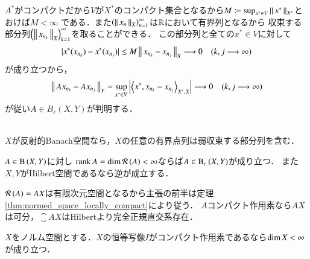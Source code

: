 \begin{prf}
\begin{description}
\begin{description}
						$A^*$がコンパクトだから$V$が$X^*$のコンパクト集合となるから$M \coloneqq \operatorname*{sup}_{x^* \in V} \left\|\, x^*\, \right\|_{X^*}$とおけば$M < \infty$
						である．また$\left(\left\|\, x_n\, \right\|_{X}\right)_{n=1}^{\infty}$は$\mathbb{R}$において有界列となるから
						収束する部分列$\left(\left\|\, x_{n_k}\, \right\|_{X}\right)_{k=1}^{\infty}$を取ることができる．
						この部分列と全ての$x^* \in V$に対して
						\begin{align}
							|x^*(x_{n_k}) - x^*(x_{n_j})| \leq M\left\|\, x_{n_k} - x_{n_j}\, \right\|_{X} \longrightarrow 0 \quad (k,j \longrightarrow \infty)
						\end{align}
						が成り立つから，
						\begin{align}
							\Norm{Ax_{n_k} - Ax_{n_j}}{Y} = \sup{x^* \in V}{\left|\inprod<x^*,x_{n_k} - x_{n_j}>_{X^*,X}\right|} \longrightarrow 0 \quad (k,j \longrightarrow \infty)
						\end{align}
						が従い$A \in B_c(X,Y)$が判明する．
						\QED
				\end{description}
		\end{description}
	\end{prf}
	
	\begin{screen}
		\begin{thm}[反射的Banach空間の弱点列コンパクト性]\mbox{}\\
			$X$が反射的Banach空間なら，$X$の任意の有界点列は弱収束する部分列を含む．
			\label{thm:weak_seq_compact}
		\end{thm}
	\end{screen}
	
	\begin{screen}
		\begin{thm}[有限次元空間における有界点列の収束]
			$A \in \mathrm{B}\left(X,Y\right) $に対し
			$\operatorname{rank} A = \operatorname{dim} \mathcal{R}\left( A \right) < \infty$ならば$A \in \mathrm{B}_c\left(X,Y\right) $が成り立つ．
			また$X,Y$がHilbert空間であるなら逆が成立する．
		\end{thm}
	\end{screen}
	
	\begin{prf}
		$\mathcal{R}\left( A \right) = AX$は有限次元空間となるから主張の前半は定理\ref{thm:normed_space_locally_compact}により従う．
		$A$コンパクト作用素なら$AX$は可分，$\closure{AX}$はHilbertより完全正規直交系存在．
		\QED
	\end{prf}
	
	\begin{screen}
		\begin{thm}[恒等写像がコンパクト作用素なら有限次元]
			$X$をノルム空間とする．$X$の恒等写像$I$がコンパクト作用素であるなら$\operatorname{dim} X < \infty$が成り立つ．
			\label{thm:compact_identity_operator_and_dimension}
		\end{thm}
	\end{screen}
	
